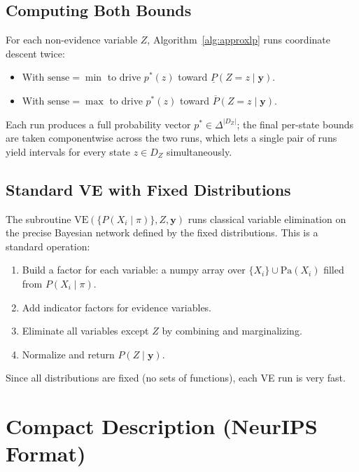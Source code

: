 \documentclass[11pt]{article}
\begin{document}
\subsection{Computing Both Bounds}

For each non-evidence variable $Z$, Algorithm~\ref{alg:approxlp} runs coordinate
descent twice:
\begin{itemize}
  \item With $\mathrm{sense} = \min$ to drive $p^*(z)$ toward $\underline{P}(Z{=}z \mid \mathbf{y})$.
  \item With $\mathrm{sense} = \max$ to drive $p^*(z)$ toward $\overline{P}(Z{=}z \mid \mathbf{y})$.
\end{itemize}
Each run produces a full probability vector $p^* \in \Delta^{|D_Z|}$; the final
per-state bounds are taken componentwise across the two runs, which lets a single
pair of runs yield intervals for every state $z \in D_Z$ simultaneously.

\subsection{Standard VE with Fixed Distributions}

The subroutine $\mathrm{VE}(\{P(X_i \mid \pi)\}, Z, \mathbf{y})$ runs classical variable
elimination on the precise Bayesian network defined by the fixed distributions. This is
a standard operation:
\begin{enumerate}
  \item Build a factor for each variable: a numpy array over $\{X_i\} \cup \mathrm{Pa}(X_i)$
        filled from $P(X_i \mid \pi)$.
  \item Add indicator factors for evidence variables.
  \item Eliminate all variables except $Z$ by combining and marginalizing.
  \item Normalize and return $P(Z \mid \mathbf{y})$.
\end{enumerate}
Since all distributions are fixed (no sets of functions), each VE run is very fast.

\section{Compact Description (NeurIPS Format)}\label{sec:compact}
\end{document}
